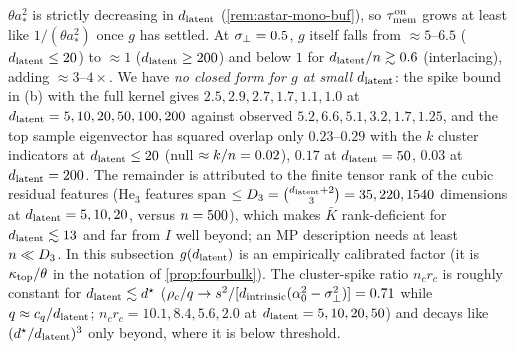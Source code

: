 \begin{proposition}
\begin{enumerate}
\end{enumerate}
$\theta a_*^2$ is strictly decreasing in $d_{\mathrm{latent}}$ (\cref{rem:astar-mono-buf}), so $\tau_{\mathrm{mem}}^{\rm on}$ grows at least like $1/(\theta a_*^2)$ once $g$ has settled. At $\sigma_{\perp}=0.5$, $g$ itself falls from $\approx5$--$6.5$ ($d_{\mathrm{latent}}\le20$) to $\approx1$ ($d_{\mathrm{latent}}\ge200$) and below $1$ for $d_{\mathrm{latent}}/n\gtrsim0.6$ (interlacing), adding $\approx3$--$4\times$. We have \emph{no closed form for $g$ at small $d_{\mathrm{latent}}$}: the spike bound in (b) with the full kernel gives $2.5,2.9,2.7,1.7,1.1,1.0$ at $d_{\mathrm{latent}}=5,10,20,50,100,200$ against observed $5.2,6.6,5.1,3.2,1.7,1.25$, and the top sample eigenvector has squared overlap only $0.23$--$0.29$ with the $k$ cluster indicators at $d_{\mathrm{latent}}\le20$ (null $\approx k/n=0.02$), $0.17$ at $d_{\mathrm{latent}}=50$, $0.03$ at $d_{\mathrm{latent}}=200$. The remainder is attributed to the finite tensor rank of the cubic residual features ($\mathrm{He}_3$ features span $\le D_3=\binom{d_{\mathrm{latent}}+2}{3}=35,220,1540$ dimensions at $d_{\mathrm{latent}}=5,10,20$, versus $n=500$), which makes $\bar K$ rank-deficient for $d_{\mathrm{latent}}\lesssim13$ and far from $I$ well beyond; an MP description needs at least $n\ll D_3$. In this subsection $g(d_{\mathrm{latent}})$ is an empirically calibrated factor (it is $\kappa_{\rm top}/\theta$ in the notation of \cref{prop:fourbulk}). The cluster-spike ratio $n_cr_c$ is roughly constant for $d_{\mathrm{latent}}\lesssim d^\star$ ($\rho_c/q\to s^2/[d_{\mathrm{intrinsic}}(\alpha_0^2-\sigma_{\perp}^2)]=0.71$ while $q\approx c_q/d_{\mathrm{latent}}$; $n_cr_c=10.1,8.4,5.6,2.0$ at $d_{\mathrm{latent}}=5,10,20,50$) and decays like $(d^\star/d_{\mathrm{latent}})^3$ only beyond, where it is below threshold.
\end{proposition}
